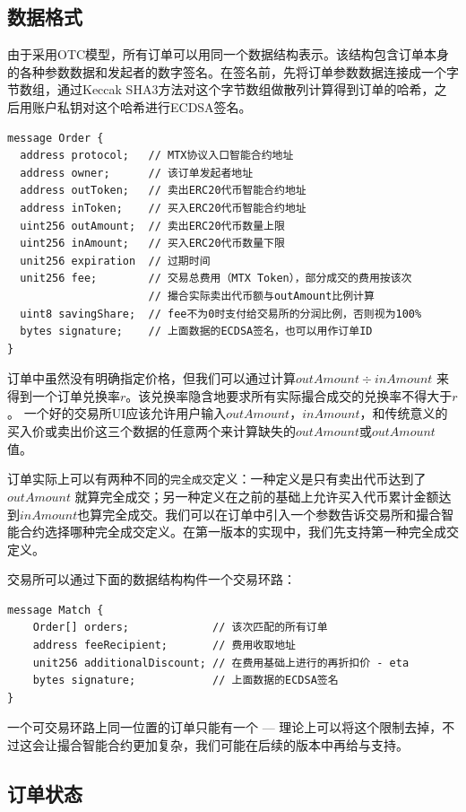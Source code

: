 \documentclass[UTF8,nofonts]{ctexart}
\begin{document}
\subsection{数据格式\label{sec:dataformat}}

由于采用OTC模型，所有订单可以用同一个数据结构表示。该结构包含订单本身的各种参数数据和发起者的数字签名。在签名前，先将订单参数数据连接成一个字节数组，通过Keccak SHA3方法对这个字节数组做散列计算得到订单的哈希，之后用账户私钥对这个哈希进行ECDSA签名。


\begin{verbatim}
message Order {
  address protocol;   // MTX协议入口智能合约地址
  address owner;      // 该订单发起者地址
  address outToken;   // 卖出ERC20代币智能合约地址
  address inToken;    // 买入ERC20代币智能合约地址
  uint256 outAmount;  // 卖出ERC20代币数量上限
  uint256 inAmount;   // 买入ERC20代币数量下限
  unit256 expiration  // 过期时间
  unit256 fee;        // 交易总费用（MTX Token），部分成交的费用按该次
                      // 撮合实际卖出代币额与outAmount比例计算
  uint8 savingShare;  // fee不为0时支付给交易所的分润比例，否则视为100%
  bytes signature;    // 上面数据的ECDSA签名，也可以用作订单ID
}	
\end{verbatim}

订单中虽然没有明确指定价格，但我们可以通过计算$outAmount \div inAmount$ 来得到一个订单兑换率$r$。该兑换率隐含地要求所有实际撮合成交的兑换率不得大于$r$。 一个好的交易所UI应该允许用户输入$outAmount$，$inAmount$，和传统意义的买入价或卖出价这三个数据的任意两个来计算缺失的$outAmount$或$outAmount$值。

订单实际上可以有两种不同的\texttt{完全成交}定义：一种定义是只有卖出代币达到了$outAmount$ 就算完全成交；另一种定义在之前的基础上允许买入代币累计金额达到$inAmount$也算完全成交。我们可以在订单中引入一个参数告诉交易所和撮合智能合约选择哪种完全成交定义。在第一版本的实现中，我们先支持第一种完全成交定义。


交易所可以通过下面的数据结构构件一个交易环路：
\begin{verbatim}
message Match {
    Order[] orders;             // 该次匹配的所有订单
    address feeRecipient;       // 费用收取地址
    unit256 additionalDiscount; // 在费用基础上进行的再折扣价 - eta
    bytes signature;            // 上面数据的ECDSA签名
}
\end{verbatim}

一个可交易环路上同一位置的订单只能有一个 --- 理论上可以将这个限制去掉，不过这会让撮合智能合约更加复杂，我们可能在后续的版本中再给与支持。

\subsection{订单状态\label{sec:orderstate}}
\end{document}

